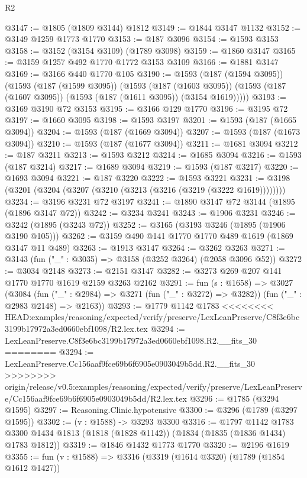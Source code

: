 \begin{lexlean}{R2}
\begin{coremodule}
{{{{{{{{{{{{{{{{{{{{{{{{{{{{{{{{{{{{{{{{{{{{{{{{{{{{{{{{{{{{{{{{{{{{{{{{{{{{{{{{{{{{{{{{{{{{@3147 := @1805 (@1809 @3144) @1812
@3149 := @1844 @3147 @1132
@3152 := @3149 @1259 @1773 @1770
@3153 := @187 @3096
@3154 := @1593 @3153
@3158 := @3152 (@3154 @3109) (@1789 @3098)
@3159 := @1860 @3147
@3165 := @3159 @1257 @492 @1770 @1772 @3153 @3109
@3166 := @1881 @3147
@3169 := @3166 @440 @1770 @105
@3190 := @1593
    (@187 (@1594 @3095))
    (@1593
      (@187 (@1599 @3095))
      (@1593
        (@187 (@1603 @3095))
        (@1593 (@187 (@1607 @3095)) (@1593 (@187 (@1611 @3095)) (@3154 @1619)))))
@3193 := @3169 @3190 @72 @3153
@3195 := @3166 @129 @1770
@3196 := @3195 @72
@3197 := @1660 @3095
@3198 := @1593 @3197
@3201 := @1593 (@187 (@1665 @3094))
@3204 := @1593 (@187 (@1669 @3094))
@3207 := @1593 (@187 (@1673 @3094))
@3210 := @1593 (@187 (@1677 @3094))
@3211 := @1681 @3094
@3212 := @187 @3211
@3213 := @1593 @3212
@3214 := @1685 @3094
@3216 := @1593 (@187 @3214)
@3217 := @1689 @3094
@3219 := @1593 (@187 @3217)
@3220 := @1693 @3094
@3221 := @187 @3220
@3222 := @1593 @3221
@3231 := @3198 (@3201 (@3204 (@3207 (@3210 (@3213 (@3216 (@3219 (@3222 @1619))))))))
@3234 := @3196 @3231 @72 @3197
@3241 := @1890 @3147 @72 @3144 (@1895 (@1896 @3147 @72))
@3242 := @3234 @3241
@3243 := @1906 @3231
@3246 := @3242 (@1895 (@3243 @72))
@3252 := @3165 (@3193 @3246 (@1895 (@1906 @3190 @105)))
@3262 := @3159 @490 @141 @1770 @1770 @489 @1619 (@1869 @3147 @11 @489)
@3263 := @1913 @3147
@3264 := @3262 @3263
@3271 := @3143 (fun ("_" : @3035) => @3158 (@3252 @3264) (@2058 @3096 @52))
@3272 := @3034 @2148
@3273 := @2151 @3147
@3282 := @3273 @269 @207 @141 @1770 @1770 @1619 @2159 @3263 @2162
@3291 := fun (s : @1658) =>
  @3027
    (@3084
      (fun ("_" : @2984) => @3271 (fun ("_" : @3272) => @3282))
      (fun ("_" : @2983 @2148) => @2163))
@3293 := @1779 @1142 @1783
<<<<<<<< HEAD:examples/reasoning/expected/verify/preserve/LexLeanPreserve/C8f3e6bc3199b17972a3ed0660ebf1098/R2.lex.tex
@3294 := LexLeanPreserve.C8f3e6bc3199b17972a3ed0660ebf1098.R2.__fits_30
========
@3294 := LexLeanPreserve.Cc156aaf9fce69b6f6905e0903049b5dd.R2.__fits_30
>>>>>>>> origin/release/v0.5:examples/reasoning/expected/verify/preserve/LexLeanPreserve/Cc156aaf9fce69b6f6905e0903049b5dd/R2.lex.tex
@3296 := @1785 (@3294 @1595)
@3297 := Reasoning.Clinic.hypotensive
@3300 := @3296 (@1789 (@3297 @1595))
@3302 := (v : @1588) -> @3293 @3300
@3316 := @1797
    @1142
    @1783
    @3300
    @1434
    @1813
    (@1818 (@1828 @1142))
    (@1834 (@1835 (@1836 @1434) @1783 @1812))
@3319 := @1846 @1432 @1773 @1770
@3320 := @2196 @1619
@3355 := fun (v : @1588) =>
  @3316
    (@3319
      (@1614 @3320)
      (@1789 (@1854 @1612 @1427))
}}}}}}}}}}}}}}}}}}}}}}}}}}}}}}}}}}}}}}}}}}}}}}}}}}}}}}}}}}}}}}}}}}}}}}}}}}}}}}}}}}}}}}}}}}}}
\end{coremodule}
\end{lexlean}
